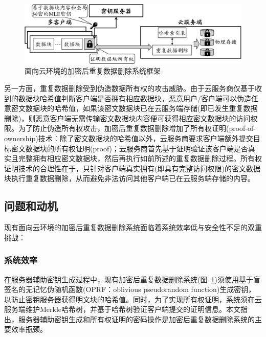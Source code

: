 \begin{figure}[!htb]
    \small
    \centering
    \includegraphics[width=\textwidth]{pic/Cloud-encrypted-deduplication-logic.pdf}
    \caption{面向云环境的加密后重复数据删除系统框架}
    \label{fig:Cloud-based-encrypted-deduplication-storage-logic}
\end{figure}

另一方面，重复数据删除受到伪造数据所有权的攻击威胁\cite{harnik2010side,mulazzani11}。由于云服务商仅基于收到的数据块哈希值判断客户端是否拥有相应数据块，恶意用户/客户端可以伪造任意密文数据块的哈希值，如果该密文数据块已在云服务端存储(即已发生重复数据删除)，则恶意客户端无需传输密文数据块内容便可获得相应密文数据块的访问权限。为了防止伪造所有权攻击，加密后重复数据删除增加了所有权证明(proof-of-ownership)技术\cite{halevi11}：除了密文数据块的哈希值以外，云服务商要求客户端额外提交目标密文数据块的所有权证明(proof)；云服务商首先基于证明验证该客户端是否真实且完整拥有相应密文数据块，然后再执行如前所述的重复数据删除过程。所有权证明技术的合理性在于，只针对客户端真实拥有(即具有完整访问权限)的密文数据块执行重复数据删除，从而避免非法访问其他客户端已在云服务端存储的内容。

\subsection{问题和动机}
\label{subsec:intro-problem}

现有面向云环境的加密后重复数据删除系统面临着系统效率低与安全性不足的双重挑战：

\subsubsection{系统效率} 
\label{subsubsec:intro-problem-performance}

在服务器辅助密钥生成过程中，现有加密后重复数据删除系统(图~\ref{fig:Cloud-based-encrypted-deduplication-storage-logic})须使用基于盲签名\cite{armknecht2015transparent,bellare2013DupLESS}的无记忆伪随机函数(OPRF：oblivious pseudorandom function)生成密钥\cite{bellare2013DupLESS}，以防止密钥服务器获得明文块的哈希值。同时，为了实现所有权证明，系统须在云服务端维护Merkle哈希树，并基于哈希树验证客户端提交的证明信息\cite{halevi2011proofs}。本文指出，服务器辅助密钥生成和所有权证明的密码操作是加密后重复数据删除系统的主要效率瓶颈。

